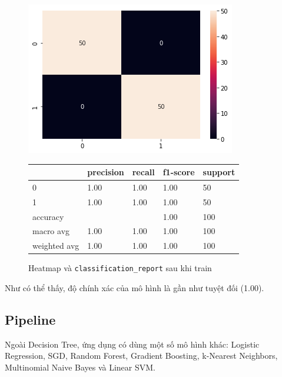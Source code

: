\documentclass[12pt]{article}
\begin{document}
\begin{figure}[H]
\begin{multicols}{2}
\includegraphics[scale=.5]{img/train-result.png}

\begin{table}[H]
\begin{tabular}{l l l l l}
\hline
 & precision & recall & f1-score & support \\
\hline
0 & 1.00 & 1.00 & 1.00 & 50 \\
1 & 1.00 & 1.00 & 1.00 & 50 \\
accuracy &   &   & 1.00 & 100 \\
macro avg & 1.00 & 1.00 & 1.00 & 100 \\
weighted avg & 1.00 & 1.00 & 1.00 & 100 \\
\hline
\end{tabular}
\end{table}
\end{multicols}
\label{fig:heatmap_testing}
\caption{Heatmap và \texttt{classification\_report} sau khi train}
\end{figure}
Như có thể thấy, độ chính xác của mô hình là gần như tuyệt đối (1.00).

\subsection{Pipeline}
Ngoài Decision Tree, ứng dụng có dùng một số mô hình khác: Logistic Regression, SGD, Random Forest, Gradient Boosting, k-Nearest Neighbors, Multinomial Naive Bayes và Linear SVM.
\end{document}
